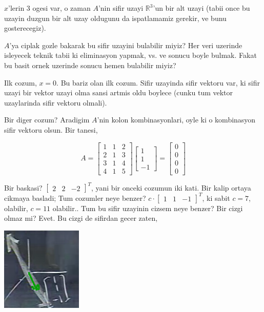 \documentclass[12pt,fleqn]{article}\usepackage{../common}
\begin{document}
$x$'lerin 3 ogesi var, o zaman $A$'nin sifir uzayi $\mathbb{R}^3$'un bir
alt uzayi (tabii once bu uzayin duzgun bir alt uzay oldugunu da
ispatlamamiz gerekir, ve bunu gosterecegiz). 

$A$'ya ciplak gozle bakarak bu sifir uzayini bulabilir miyiz? Her veri
uzerinde isleyecek teknik tabii ki eliminasyon yapmak, vs. ve sonucu boyle
bulmak. Fakat bu basit ornek uzerinde sonucu hemen bulabilir miyiz? 

Ilk cozum, $x=0$. Bu bariz olan ilk cozum. Sifir uzayinda sifir vektoru
var, ki sifir uzayi bir vektor uzayi olma sansi artmis oldu boylece (cunku
tum vektor uzaylarinda sifir vektoru olmali). 

Bir diger cozum? Aradigim $A$'nin kolon kombinasyonlari, oyle ki o
kombinasyon sifir vektoru olsun. Bir tanesi,

$$ A = 
\left[\begin{array}{rrr}
1 & 1 & 2 \\
2 & 1 & 3 \\
3 & 1 & 4 \\
4 & 1 & 5 
\end{array}\right]
\left[\begin{array}{r}
1  \\
1  \\
-1  
\end{array}\right] 
=
\left[\begin{array}{r}
0  \\
0  \\
0  \\
0  
\end{array}\right]
 $$

 Bir baskasi? $\left[\begin{array}{rrr}2 & 2 & -2\end{array}\right]^T$,
 yani bir onceki cozumun iki kati. Bir kalip ortaya cikmaya basladi; Tum
 cozumler neye benzer? $c \cdot \left[\begin{array}{rrr}1 & 1 &
 -1\end{array}\right]^T$, ki sabit $c=7$, olabilir, $c=11$
 olabilir.. Tum bu sifir uzayinin cizsem neye benzer? Bir cizgi olmaz mi?
 Evet. Bu cizgi de sifirdan gecer zaten,

\includegraphics[height=4cm]{6_02.png}
\end{document}
